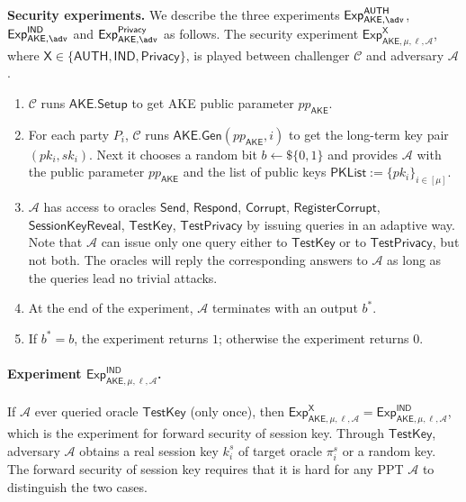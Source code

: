 \documentclass[a4paper,11pt]{article}
\begin{document}
\begin{sloppypar}
\medskip\noindent\textbf{Security experiments.}
We describe the three experiments ${\sf Exp}_{\mathsf{AKE},\adv}^{\mathsf{AUTH}}$, ${\sf Exp}_{\mathsf{AKE},\adv}^{\mathsf{IND}}$ and ${\sf Exp}_{\mathsf{AKE},\adv}^{\mathsf{Privacy}}$ as follows.
The security experiment $\mathsf{Exp}^{\mathsf{X}}_{\mathsf{AKE},\mu,\ell,\mathcal{A}}$, where $\mathsf{X} \in \{\mathsf{AUTH}, \mathsf{IND}, \mathsf{Privacy}\}$, is played between challenger $\mathcal{C}$ and adversary $\mathcal{A}$.

\begin{enumerate}
    \item $\mathcal{C}$ runs $\mathsf{AKE.Setup}$ to get AKE public parameter $pp_{\mathsf{AKE}}$.
    \item For each party $P_i$, $\mathcal{C}$ runs $\mathsf{AKE.Gen}(pp_{\mathsf{AKE}}, i)$ to get the long-term key pair $(pk_i, sk_i)$. Next it chooses a random bit $b \gets \$ \{0, 1\}$ and provides $\mathcal{A}$ with the public parameter $pp_{\mathsf{AKE}}$ and the list of public keys $\mathsf{PKList} := \{pk_i\}_{i \in [\mu]}$.
    \item $\mathcal{A}$ has access to oracles $\mathsf{Send}$, $\mathsf{Respond}$, $\mathsf{Corrupt}$, $\mathsf{RegisterCorrupt}$, $\mathsf{SessionKeyReveal}$, $\mathsf{TestKey}$, $\mathsf{TestPrivacy}$ by issuing queries in an adaptive way. Note that $\mathcal{A}$ can issue only one query either to $\mathsf{TestKey}$ or to $\mathsf{TestPrivacy}$, but not both. The oracles will reply the corresponding answers to $\mathcal{A}$ as long as the queries lead no trivial attacks.
    \item At the end of the experiment, $\mathcal{A}$ terminates with an output $b^*$.
    \item If $b^* = b$, the experiment returns $1$; otherwise the experiment returns $0$.
\end{enumerate}

\paragraph{Experiment $\mathsf{Exp}^{\mathsf{IND}}_{\mathsf{AKE},\mu,\ell,\mathcal{A}}$.} If $\mathcal{A}$ ever queried oracle $\mathsf{TestKey}$ (only once), then $\mathsf{Exp}^{\mathsf{X}}_{\mathsf{AKE},\mu,\ell,\mathcal{A}} = \mathsf{Exp}^{\mathsf{IND}}_{\mathsf{AKE},\mu,\ell,\mathcal{A}}$, which is the experiment for forward security of session key. Through $\mathsf{TestKey}$, adversary $\mathcal{A}$ obtains a real session key $k^s_i$ of target oracle $\pi^s_i$ or a random key. The forward security of session key requires that it is hard for any PPT $\mathcal{A}$ to distinguish the two cases.


\end{sloppypar}
\end{document}
